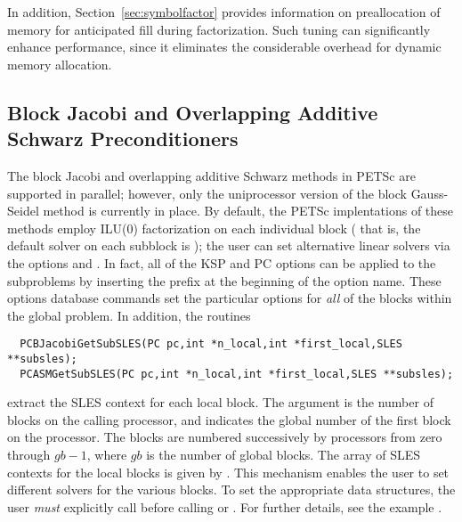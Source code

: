 In addition, Section~\ref{sec:symbolfactor} provides information on
preallocation of memory for anticipated fill during factorization.  
Such tuning can significantly enhance performance, since it
eliminates the considerable overhead for dynamic memory allocation.

\subsection{Block Jacobi and 
            Overlapping Additive Schwarz Preconditioners}
\label{sec:bjacobi}

 
  
The block Jacobi and overlapping additive Schwarz methods in PETSc are
supported in parallel; however, only the uniprocessor
version of the block Gauss-Seidel method is currently in place.
By default, the PETSc implentations of these methods
employ ILU(0) factorization on each individual block ( that is, the default solver on each 
subblock is ); the user can set alternative linear solvers via the options 
 
 and . In fact, all of the KSP
and PC options can be applied to the subproblems by inserting the prefix
 at the beginning of the option name. 
These options database commands set the particular options for {\em all} 
of the blocks within the global problem.  In addition, the routines
\begin{verbatim}
  PCBJacobiGetSubSLES(PC pc,int *n_local,int *first_local,SLES **subsles);
  PCASMGetSubSLES(PC pc,int *n_local,int *first_local,SLES **subsles);
\end{verbatim}
extract the  SLES context for each local 
block.  The argument  is the number of blocks on the 
calling processor, and  indicates the global number 
of the first block on the processor. The blocks are numbered 
successively by processors from zero through $ gb-1$, 
where $ gb $ is the number of global blocks.  
The array of SLES contexts for the local blocks is given by . 
This mechanism enables the user to set different solvers for the 
various blocks.  To set the appropriate data structures, the 
user {\em must} explicitly call   
before calling  or
.
For further details, see the 
example .

